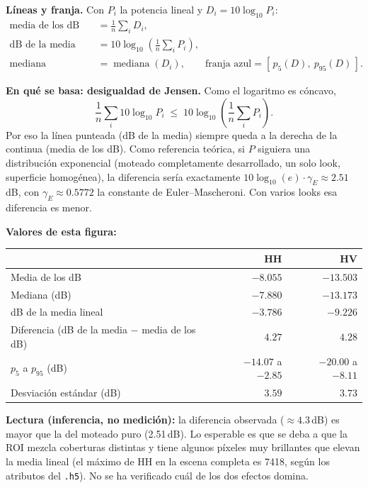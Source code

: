 \documentclass[11pt,a4paper]{article}
\begin{document}
\textbf{Líneas y franja.} Con $P_i$ la potencia lineal y $D_i = 10\log_{10}P_i$:
\begin{align}
  \text{media de los dB} &= \frac{1}{n}\sum_i D_i, \\
  \text{dB de la media lineal} &= 10\log_{10}\!\left(\frac{1}{n}\sum_i P_i\right), \\
  \text{mediana} &= \operatorname{mediana}(D_i), \qquad \text{franja azul} = [\,p_5(D),\ p_{95}(D)\,].
\end{align}

\textbf{En qué se basa: desigualdad de Jensen.} Como el logaritmo es cóncavo,
\begin{equation}
  \frac{1}{n}\sum_i 10\log_{10}P_i \;\le\; 10\log_{10}\!\left(\frac{1}{n}\sum_i P_i\right).
\end{equation}
Por eso la línea punteada (dB de la media) siempre queda a la derecha de la continua (media de los dB). Como referencia teórica, si
$P$ siguiera una distribución exponencial (moteado completamente desarrollado, un solo look, superficie homogénea), la diferencia
sería exactamente $10\log_{10}(e)\cdot\gamma_E \approx 2.51$\,dB, con $\gamma_E \approx 0.5772$ la constante de Euler--Mascheroni.
Con varios looks esa diferencia es menor.

\textbf{Valores de esta figura:}

\begin{longtable}{lrr}
\toprule
 & \textbf{HH} & \textbf{HV} \\
\midrule
Media de los dB & $-8.055$ & $-13.503$ \\
Mediana (dB) & $-7.880$ & $-13.173$ \\
dB de la media lineal & $-3.786$ & $-9.226$ \\
Diferencia (dB de la media $-$ media de los dB) & $4.27$ & $4.28$ \\
$p_5$ a $p_{95}$ (dB) & $-14.07$ a $-2.85$ & $-20.00$ a $-8.11$ \\
Desviación estándar (dB) & $3.59$ & $3.73$ \\
\bottomrule
\end{longtable}

\textbf{Lectura (inferencia, no medición):} la diferencia observada ($\approx 4.3$\,dB) es mayor que la del moteado puro (2.51\,dB).
Lo esperable es que se deba a que la ROI mezcla coberturas distintas y tiene algunos píxeles muy brillantes que elevan la media lineal
(el máximo de HH en la escena completa es 7418, según los atributos del \texttt{.h5}). No se ha verificado cuál de los dos efectos
domina.
\end{document}
